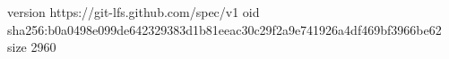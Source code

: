 version https://git-lfs.github.com/spec/v1
oid sha256:b0a0498e099de642329383d1b81eeac30c29f2a9e741926a4df469bf3966be62
size 2960
